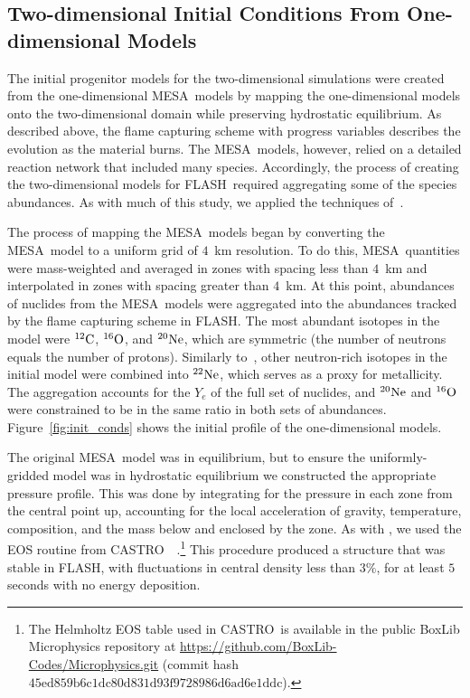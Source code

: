 \documentclass[preprint2]{aastex63}
\newcommand{\figref}[1]{Figure~\ref{#1}}
\newcommand{\C}[1]{\ensuremath{{}^{#1}{\rm C}}}
\newcommand{\Ox}[1]{\ensuremath{{}^{#1}{\rm O}}}
\newcommand{\Ne}[1]{\ensuremath{{}^{#1}{\rm Ne}}}
\newcommand{\code}[1]{\textsc{#1}}
\newcommand{\FLASH}{\code{FLASH}}
\newcommand{\CASTRO}{\code{CASTRO}}
\newcommand{\MESA}{\code{MESA}}
\begin{document}
\subsection{Two-dimensional Initial Conditions From One-dimensional Models}

The initial progenitor models for the two-dimensional simulations were
created from the one-dimensional \MESA\ models by mapping the one-dimensional
models onto the two-dimensional domain while
preserving hydrostatic equilibrium.
As described above, the flame capturing scheme with progress
variables describes the evolution as the material burns. The \MESA\
models, however, relied on a detailed reaction network that included
many species. Accordingly, the process of creating the two-dimensional
models for \FLASH\ required aggregating some of the species abundances.
As with much of this study, we applied the
techniques of~\citet{willcoxetal2016}.


The process of mapping the \MESA\ models began by converting
the \MESA\ model to a uniform grid of $4$~km resolution.
To do this, \MESA\ quantities were mass-weighted and averaged in zones with spacing less than $4$~km
and interpolated in zones with spacing greater than $4$~km.
At this point,
abundances of nuclides from the \MESA\ models were aggregated
into the abundances tracked by the flame capturing scheme in
\FLASH.
The most abundant isotopes in the model were \C{12}, \Ox{16},
and \Ne{20}, which are symmetric (the number of neutrons
equals the number of protons). Similarly to~\citet{willcoxetal2016},
other neutron-rich isotopes in the initial model were combined into
\Ne{22}, which serves as a proxy for metallicity. The aggregation
accounts for the $Y_e$ of the full set of nuclides, and \Ne{20}
and \Ox{16} were constrained to be in the same ratio in both
sets of abundances. \figref{fig:init_conds} shows the initial
profile of the one-dimensional models.

The original \MESA\ model was in equilibrium, but to ensure
the uniformly-gridded model was in hydrostatic equilibrium we
constructed the appropriate pressure profile. This was done by
integrating for the pressure in each zone from the central point up,
accounting for the local acceleration of gravity, temperature,
composition, and the mass below and enclosed by the zone. As
with \citet{willcoxetal2016}, we used the EOS routine from
\CASTRO\ ~\citep{timmes.swesty:accuracy,castro1}.\footnote{The
Helmholtz EOS table used in \CASTRO\ is available in the public BoxLib
Microphysics repository at
  \url{https://github.com/BoxLib-Codes/Microphysics.git} (commit
  hash $\mathrm{45ed859b6c1dc80d831d93f9728986d6ad6e1ddc}$).} 
This procedure produced a structure that was stable in \FLASH, with 
fluctuations in central density less than $3\%$, for at least $5$ 
seconds with no energy deposition.
\end{document}
